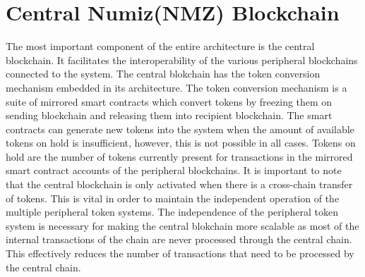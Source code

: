 \documentclass[a4paper,twoside,phd]{BYUPhys}
\begin{document}
\section{Central Numiz(NMZ) Blockchain}
The most important component of the entire architecture is the central blockchain. It facilitates the interoperability of the various peripheral blockchains connected to the system. The central blokchain has the token conversion mechanism embedded in its architecture. The token conversion mechanism is a suite of mirrored smart contracts which convert tokens by freezing them on sending blockchain and releasing them into recipient blockchain. The smart contracts can generate new tokens into the system when the amount of available tokens on hold is insufficient, however, this is not possible in all cases. Tokens on hold are the number of tokens currently present for transactions in the mirrored smart contract accounts of the peripheral blockchains. It is important to note that the central blockchain is only activated when there is a cross-chain transfer of tokens. This is vital in order to maintain the independent operation of the multiple peripheral token systems. The independence of the peripheral token system is necessary for making the central blokchain more scalable as most of the internal transactions of the chain are never processed through the central chain. This effectively reduces the number of transactions that need to be processed by the central chain.
\end{document}
